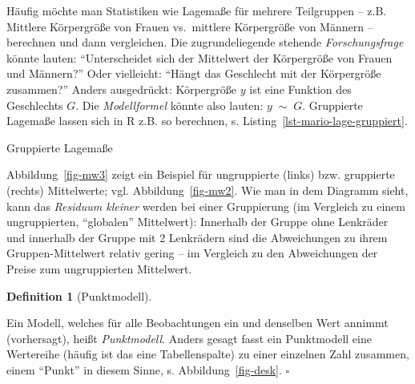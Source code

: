 \documentclass[
  letterpaper,
  twoside,
  open=any]{scrbook}
\newenvironment{Shaded}{\begin{snugshade}}{\end{snugshade}}
\newcommand{\AttributeTok}[1]{\textcolor[rgb]{0.40,0.45,0.13}{#1}}
\newcommand{\CommentTok}[1]{\textcolor[rgb]{0.37,0.37,0.37}{#1}}
\newcommand{\FunctionTok}[1]{\textcolor[rgb]{0.28,0.35,0.67}{#1}}
\newcommand{\NormalTok}[1]{\textcolor[rgb]{0.00,0.23,0.31}{#1}}
\newcommand{\OtherTok}[1]{\textcolor[rgb]{0.00,0.23,0.31}{#1}}
\newcommand{\SpecialCharTok}[1]{\textcolor[rgb]{0.37,0.37,0.37}{#1}}
\theoremstyle{definition}
\newtheorem{definition}{Definition}[chapter]
\theoremstyle{definition}
\theoremstyle{definition}
\theoremstyle{remark}
\begin{document}
Häufig möchte man Statistiken wie Lagemaße für mehrere Teilgruppen --
z.B. Mittlere Körpergröße von Frauen vs.~mittlere Körpergröße von
Männern -- berechnen und dann vergleichen. Die zugrundeliegende stehende
\emph{Forschungsfrage} könnte lauten: \enquote{Unterscheidet sich der
Mittelwert der Körpergröße von Frauen und Männern?} Oder vielleicht:
\enquote{Hängt das Geschlecht mit der Körpergröße zusammen?} Anders
ausgedrückt: Körpergröße \(y\) ist eine Funktion des Geschlechts \(G\).
Die \emph{Modellformel} könnte also lauten: \({y} \;{ \sim } \; {G}\).
Gruppierte Lagemaße lassen sich in R z.B. so berechnen, s.
Listing~\ref{lst-mario-lage-gruppiert}.

\begin{codelisting}

\caption{\label{lst-mario-lage-gruppiert}Gruppierte Lagemaße}

\centering{

\begin{Shaded}
\begin{Highlighting}[]
\NormalTok{mariokart\_lagemaße\_gruppiert }\OtherTok{\textless{}{-}}
\NormalTok{  mariokart }\SpecialCharTok{\%\textgreater{}\%} 
  \FunctionTok{group\_by}\NormalTok{(wheels) }\SpecialCharTok{\%\textgreater{}\%}  \CommentTok{\# neue Zeile, der Rest ist gleich!}
  \FunctionTok{summarise}\NormalTok{(}\AttributeTok{mw =} \FunctionTok{mean}\NormalTok{(total\_pr))}
\end{Highlighting}
\end{Shaded}

}

\end{codelisting}%

Abbildung~\ref{fig-mw3} zeigt ein Beispiel für ungruppierte (links) bzw.
gruppierte (rechts) Mittelwerte; vgl. Abbildung~\ref{fig-mw2}. Wie man
in dem Diagramm sieht, kann das \emph{Residuum kleiner} werden bei einer
Gruppierung (im Vergleich zu einem ungruppierten, \enquote{globalen}
Mittelwert): Innerhalb der Gruppe ohne Lenkräder und innerhalb der
Gruppe mit 2 Lenkrädern sind die Abweichungen zu ihrem
Gruppen-Mittelwert relativ gering -- im Vergleich zu den Abweichungen
der Preise zum ungruppierten Mittelwert.

\begin{definition}[Punktmodell]\protect\hypertarget{def-punktmodell}{}\label{def-punktmodell}

Ein Modell, welches für alle Beobachtungen ein und denselben Wert
annimmt (vorhersagt), heißt \emph{Punktmodell}. Anders gesagt fasst ein
Punktmodell eine Wertereihe (häufig ist das eine Tabellenspalte) zu
einer einzelnen Zahl zusammen, einem \enquote{Punkt} in diesem Sinne, s.
Abbildung~\ref{fig-desk}. \(\square\)

\end{definition}
\end{document}
